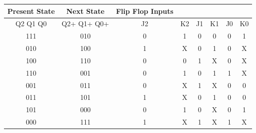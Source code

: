 \documentclass{article}
\begin{document}
 {
    \begin{tabular}{|c|c|c|c|c|c|c|c|}
        \hline
        Present State & Next State  & Flip Flop Inputs &    &    &    &    &    \\
        \hline
        Q2 Q1 Q0      & Q2+ Q1+ Q0+ & J2               & K2 & J1 & K1 & J0 & K0 \\
        \hline
        111           & 010         & 0                & 1  & 0  & 0  & 0  & 1  \\
        \hline
        010           & 100         & 1                & X  & 0  & 1  & 0  & X  \\
        \hline
        100           & 110         & 0                & 0  & 1  & X  & 0  & X  \\
        \hline
        110           & 001         & 0                & 1  & 0  & 1  & 1  & X  \\
        \hline
        001           & 011         & 0                & X  & 1  & X  & 0  & 0  \\
        \hline
        011           & 101         & 1                & X  & 0  & 1  & 0  & 0  \\
        \hline
        101           & 000         & 0                & 1  & 0  & X  & 0  & 1  \\
        \hline
        000           & 111         & 1                & X  & 1  & X  & 1  & X  \\
        \hline
    \end{tabular}
}
\end{document}

